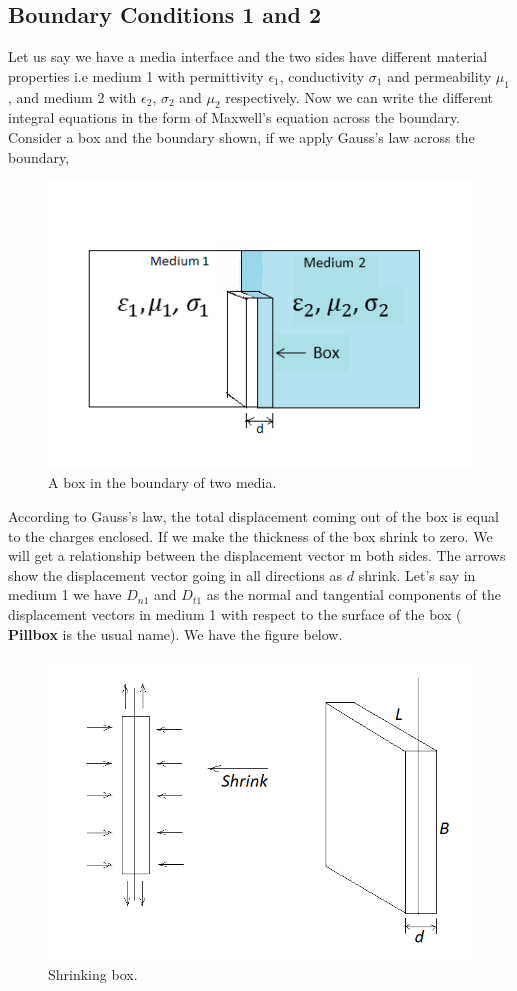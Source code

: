 \subsection{Boundary Conditions 1 and 2}
Let us say we have a media interface and the two sides have different material properties i.e medium 1 with permittivity $\epsilon_1$, conductivity $\sigma_1$ and permeability $\mu_1$, and medium 2 with $\epsilon_2$, $\sigma_2$ and $\mu_2$ respectively. Now we can write the different integral equations in the form of Maxwell's equation across the boundary. Consider a box and the boundary shown, if we apply Gauss's law across the boundary,
\begin{figure}[h]
\centering
\includegraphics[width=1.1\linewidth]{graphics/box_in_boundary}
\caption{A box in the boundary of two media.}
\end{figure}

According to Gauss's law, the total displacement coming out of the box is equal to the charges enclosed. If we make the thickness of the box shrink to zero. We will get a relationship between the displacement vector m both sides. The arrows show the displacement vector going in all directions as $d$ shrink.  Let's say in medium 1 we have $D_{n1}$ and $D_{t1}$ as the normal and tangential components of the displacement vectors in medium 1 with respect to the surface of the box (\textbf { Pillbox} is the usual name). We have the figure below.
\begin{figure}[h]
\centering
\includegraphics[width=.7\linewidth]{graphics/diemedium2}
\caption{Shrinking box.}
\end{figure}

